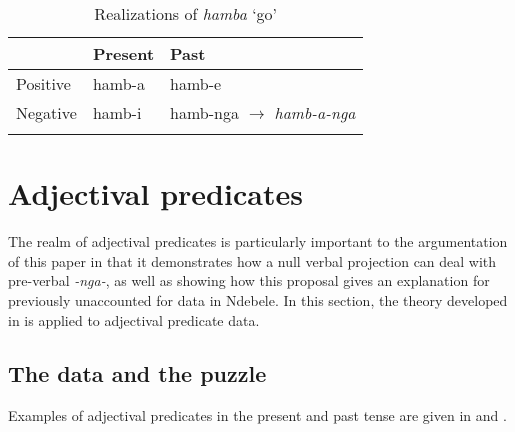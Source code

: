 \documentclass[output=paper]{langsci/langscibook}
\begin{document}
\begin{table}
\caption{Realizations of \textit{hamba} `go'} %
\centering %
\begin{tabular}{lll}
\lsptoprule
 & Present & Past\\
\midrule%
Positive & hamb-a  & hamb-e  \\ %
Negative & hamb-i & hamb-nga $\longrightarrow$ \textit{hamb-a-nga}\\[1ex] %
\lspbottomrule
\end{tabular} 
\label{tab:burkholder:5} 
\end{table} 





\section{Adjectival predicates}\label{sec:burkholder:3}

The realm of adjectival predicates is particularly important to the argumentation of this paper in that it demonstrates how a null verbal projection can deal with pre-verbal \textit{-nga-}, as well as showing how this proposal gives an explanation for previously unaccounted for data in Ndebele. In this section, the theory developed in  is applied to adjectival predicate data.

\subsection{The data and the puzzle}

Examples of adjectival predicates in the present and past tense are given in  and .
\end{document}
